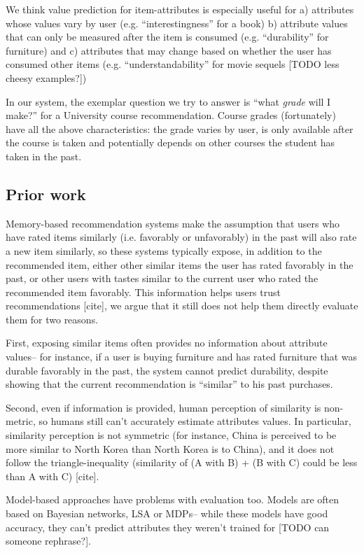 \documentclass{article} %
\begin{document}
We think value prediction for item-attributes is especially useful for a) attributes whose values vary by user (e.g. ``interestingness'' for a book) b) attribute values that can only be measured after the item is consumed (e.g. ``durability'' for furniture) and c) attributes that may change based on whether the user has consumed other items (e.g. ``understandability'' for movie sequels [TODO less cheesy examples?]) 

In our system, the exemplar question we try to answer is ``what \textit{grade} will I make?'' for a University course recommendation. Course grades (fortunately) have all the above characteristics: the grade varies by user, is only available after the course is taken and potentially depends on other courses the student has taken in the past.\subsection{Prior work}

Memory-based recommendation systems make the assumption that users who have rated items similarly (i.e. favorably or unfavorably) in the past will also rate a new item similarly, so these systems typically expose, in addition to the recommended item, either other similar items the user has rated favorably in the past, or other users with tastes similar to the current user who rated the recommended item favorably. This information helps users trust recommendations [cite], we argue that it still does not help them directly evaluate them for two reasons.

First, exposing similar items often provides no information about attribute values-- for instance, if a user is buying furniture and has rated furniture that was durable favorably in the past, the system cannot predict durability, despite showing that the current recommendation is ``similar'' to his past purchases. 

Second, even if information is provided, human perception of similarity is non-metric, so humans still can't accurately estimate attributes values. In particular, similarity perception is not symmetric (for instance, China is perceived to be more similar to North Korea than North Korea is to China), and it does not follow the triangle-inequality (similarity of (A with B) + (B with C) could be less than A with C) [cite].

Model-based approaches have problems with evaluation too. Models are often based on Bayesian networks, LSA or MDPs-- while these models have good accuracy, they can't predict attributes they weren't trained for [TODO can someone rephrase?].
\end{document}

